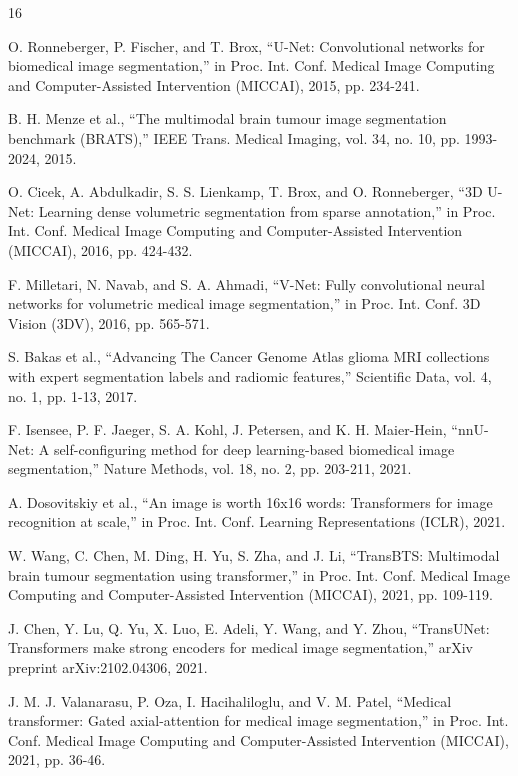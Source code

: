 \documentclass[final,3p,times,number]{elsarticle}
\begin{document}
\begin{thebibliography}{16}

 O. Ronneberger, P. Fischer, and T. Brox, ``U-Net: Convolutional networks for biomedical image segmentation,'' in Proc. Int. Conf. Medical Image Computing and Computer-Assisted Intervention (MICCAI), 2015, pp. 234-241.

 B. H. Menze et al., ``The multimodal brain tumour image segmentation benchmark (BRATS),'' IEEE Trans. Medical Imaging, vol. 34, no. 10, pp. 1993-2024, 2015.

 O. Cicek, A. Abdulkadir, S. S. Lienkamp, T. Brox, and O. Ronneberger, ``3D U-Net: Learning dense volumetric segmentation from sparse annotation,'' in Proc. Int. Conf. Medical Image Computing and Computer-Assisted Intervention (MICCAI), 2016, pp. 424-432.

 F. Milletari, N. Navab, and S. A. Ahmadi, ``V-Net: Fully convolutional neural networks for volumetric medical image segmentation,'' in Proc. Int. Conf. 3D Vision (3DV), 2016, pp. 565-571.

 S. Bakas et al., ``Advancing The Cancer Genome Atlas glioma MRI collections with expert segmentation labels and radiomic features,'' Scientific Data, vol. 4, no. 1, pp. 1-13, 2017.

 F. Isensee, P. F. Jaeger, S. A. Kohl, J. Petersen, and K. H. Maier-Hein, ``nnU-Net: A self-configuring method for deep learning-based biomedical image segmentation,'' Nature Methods, vol. 18, no. 2, pp. 203-211, 2021.

 A. Dosovitskiy et al., ``An image is worth 16x16 words: Transformers for image recognition at scale,'' in Proc. Int. Conf. Learning Representations (ICLR), 2021.

 W. Wang, C. Chen, M. Ding, H. Yu, S. Zha, and J. Li, ``TransBTS: Multimodal brain tumour segmentation using transformer,'' in Proc. Int. Conf. Medical Image Computing and Computer-Assisted Intervention (MICCAI), 2021, pp. 109-119.

 J. Chen, Y. Lu, Q. Yu, X. Luo, E. Adeli, Y. Wang, and Y. Zhou, ``TransUNet: Transformers make strong encoders for medical image segmentation,'' arXiv preprint arXiv:2102.04306, 2021.

 J. M. J. Valanarasu, P. Oza, I. Hacihaliloglu, and V. M. Patel, ``Medical transformer: Gated axial-attention for medical image segmentation,'' in Proc. Int. Conf. Medical Image Computing and Computer-Assisted Intervention (MICCAI), 2021, pp. 36-46.


\end{thebibliography}
\end{document}
